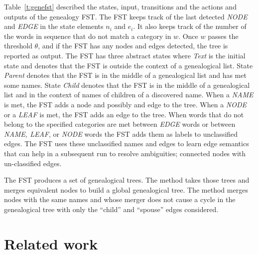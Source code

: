 \documentclass{llncs}
\begin{document}
Table~\ref{t:genefst} described the states, input, transitions and the actions and outputs of the genealogy FST. 
The FST keeps track of the last detected {\em NODE} and {\em EDGE} in the state elements $n_i$ and $e_i$.
It also keeps track of the number of the words in sequence that do not match a category in $w$. 
Once $w$ passes the threshold $\theta$, and if the FST has any nodes and edges detected, the tree is reported as output. 
The FST has three abstract states where {\em Text} 
is the initial state and denotes that the FST is outside the context of a genealogical list.
State {\em Parent} denotes that the FST is in the middle of a genealogical list and has met some names. 
State {\em Child} denotes that the FST is in the middle of a genealogical list and in the context of names of children of a discovered 
name. 
When a {\em NAME} is met, the FST adds a node and possibly and edge to the tree. 
When a {\em NODE} or a {\em LEAF} is met, the FST adds
an edge to the tree. 
When words that do not belong to the specified categories are met between {\em EDGE} words or 
between {\em NAME, LEAF}, or {\em NODE} words the FST adds them as labels to unclassified edges. 
The FST uses these unclassified names and edges to learn edge 
semantics that can help in a subsequent run to resolve 
ambiguities; connected nodes with un-classified edges. 

The FST produces a set of genealogical trees. The method takes those trees and merges equivalent 
nodes to build a global genealogical tree. 
The method merges nodes with the same names and whose merger does not cause a cycle in the genealogical tree with only the 
``child'' and ``spouse'' edges considered. 

\section{Related work }
\label{s:related}

\end{document}

